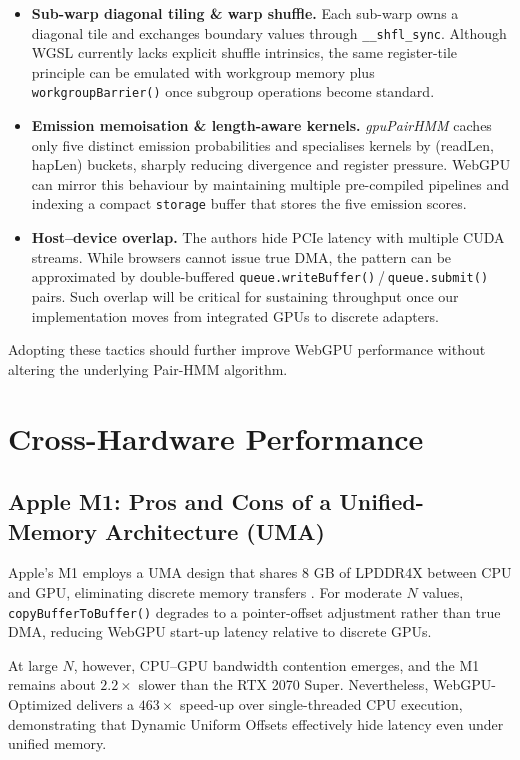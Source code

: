 \documentclass[PhD]{PHlab-thesis}
\begin{document}
\begin{itemize}
  \item \textbf{Sub-warp diagonal tiling \& warp shuffle.}  
        Each sub-warp owns a diagonal tile and exchanges boundary values through \texttt{\_\_shfl\_sync}.  
        Although WGSL currently lacks explicit shuffle intrinsics, the same register-tile principle can be emulated with workgroup memory plus \\ \texttt{workgroupBarrier()} once subgroup operations become standard.
  \item \textbf{Emission memoisation \& length-aware kernels.}  
        \textit{gpuPairHMM} caches only five distinct emission probabilities and specialises kernels by (readLen, hapLen) buckets, sharply reducing divergence and register pressure.  
        WebGPU can mirror this behaviour by maintaining multiple pre-compiled pipelines and indexing a compact \texttt{storage} buffer that stores the five emission scores.
  \item \textbf{Host–device overlap.}  
        The authors hide PCIe latency with multiple CUDA streams.  
        While browsers cannot issue true DMA, the pattern can be approximated by double-buffered \texttt{queue.writeBuffer()} / \texttt{queue.submit()} pairs.  
        Such overlap will be critical for sustaining throughput once our implementation moves from integrated GPUs to discrete adapters.
\end{itemize}

Adopting these tactics should further improve WebGPU performance without altering the underlying Pair-HMM algorithm.

\section{Cross-Hardware Performance}

\subsection{Apple M1: Pros and Cons of a Unified-Memory Architecture (UMA)}
Apple's M1 employs a UMA design that shares 8 GB of LPDDR4X between CPU and GPU, eliminating discrete memory transfers \cite{Apple2020-m1}.  
For moderate $N$ values, \texttt{copyBufferToBuffer()} degrades to a pointer-offset adjustment rather than true DMA, reducing WebGPU start-up latency relative to discrete GPUs.

At large $N$, however, CPU–GPU bandwidth contention emerges, and the M1 remains about $2.2\times$ slower than the RTX 2070 Super.  
Nevertheless, WebGPU-Optimized delivers a $463\times$ speed-up over single-threaded CPU execution, demonstrating that Dynamic Uniform Offsets effectively hide latency even under unified memory.
\end{document}
